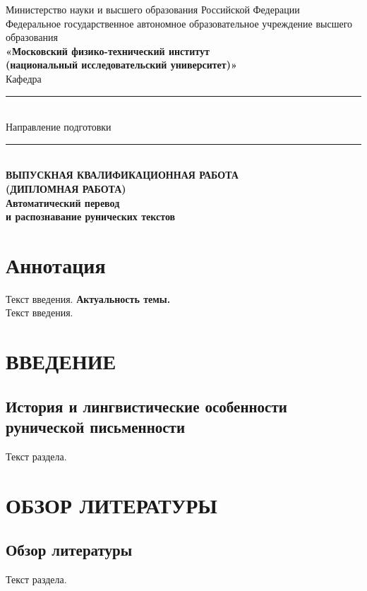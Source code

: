 \documentclass[14pt,a4paper]{extreport}
\begin{document}
\justifying
\begin{titlepage}
    \begin{center}
        Министерство науки и высшего образования Российской Федерации\\[0.5cm]
        Федеральное государственное автономное образовательное учреждение высшего образования\\[0.3cm]
        \textbf{«Московский физико-технический институт\\
        (национальный исследовательский университет)»}\\[1.5cm]
        Кафедра \rule{9cm}{0.4pt}\\[0.5cm]
        Направление подготовки \rule{6cm}{0.4pt}\\[2cm]
        {\bfseries\large ВЫПУСКНАЯ КВАЛИФИКАЦИОННАЯ РАБОТА}\\[0.5cm]
        {\bfseries\large (ДИПЛОМНАЯ РАБОТА)}\\[1.5cm]
        {\bfseries\Large Автоматический перевод\\
        и распознавание рунических текстов}
    \end{center}
\end{titlepage}
\newpage
{}
\tableofcontents
\newpage
\chapter*{Аннотация}
Текст введения.
\textbf{Актуальность темы.} \\
Текст введения.

\chapter{ВВЕДЕНИЕ}
\section{История и лингвистические особенности рунической письменности}
Текст раздела.

\chapter{ОБЗОР ЛИТЕРАТУРЫ}
\section{Обзор литературы}
Текст раздела.
\end{document}
